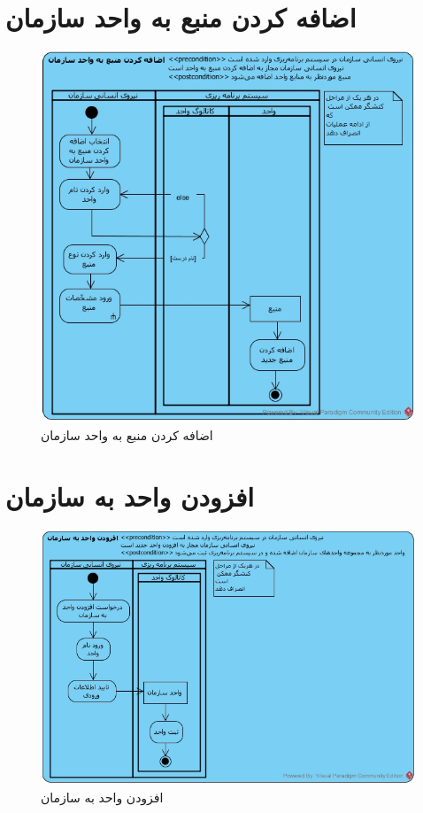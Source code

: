 \section{اضافه کردن منبع به واحد سازمان}
\begin{figure}[H]
	\centering
	\includegraphics[scale=0.8]{img/activity/AddResourceToUnit}
	\caption{اضافه کردن منبع به واحد سازمان}
\end{figure}

\section{افزودن واحد به سازمان}
\begin{figure}[H]
	\centering
	\includegraphics[scale=0.7]{img/activity/AddUnitToOrganization}
	\caption{افزودن واحد به سازمان}
\end{figure}


